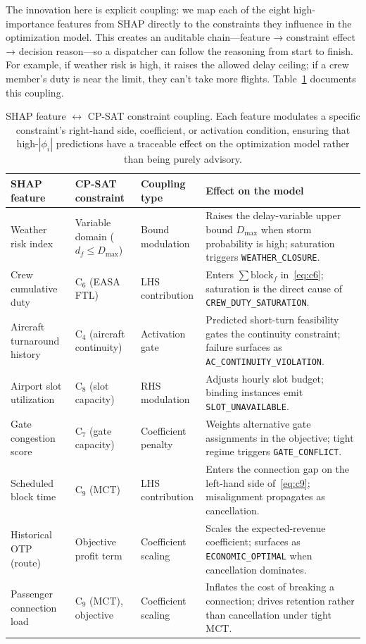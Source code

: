 \documentclass[12pt,number]{elsarticle}
\begin{document}
The innovation here is explicit coupling: we map each of the eight high-importance features from SHAP directly to the constraints they influence in the optimization model. This creates an auditable chain---feature → constraint effect → decision reason---so a dispatcher can follow the reasoning from start to finish. For example, if weather risk is high, it raises the allowed delay ceiling; if a crew member's duty is near the limit, they can't take more flights. Table~\ref{tab:xai_coupling} documents this coupling.

\begin{table}[H]
\centering
\footnotesize
\caption{SHAP feature $\leftrightarrow$ CP-SAT constraint coupling. Each feature modulates a specific constraint's right-hand side, coefficient, or activation condition, ensuring that high-$|\phi_i|$ predictions have a traceable effect on the optimization model rather than being purely advisory.}
\label{tab:xai_coupling}
\begin{tabular}{@{}>{\raggedright\arraybackslash}p{3cm}>{\raggedright\arraybackslash}p{2.2cm}>{\raggedright\arraybackslash}p{2.2cm}>{\raggedright\arraybackslash}p{5.5cm}@{}}
\toprule
\textbf{SHAP feature} & \textbf{CP-SAT constraint} & \textbf{Coupling type} & \textbf{Effect on the model} \\
\midrule
Weather risk index          & Variable domain ($d_f \leq D_{\max}$) & Bound modulation     & Raises the delay-variable upper bound $D_{\max}$ when storm probability is high; saturation triggers \texttt{WEATHER\_CLOSURE}. \\
Crew cumulative duty        & C$_6$ (EASA FTL)            & LHS contribution     & Enters $\sum \mathrm{block}_f$ in~\eqref{eq:c6}; saturation is the direct cause of \texttt{CREW\_DUTY\_SATURATION}. \\
Aircraft turnaround history & C$_4$ (aircraft continuity) & Activation gate      & Predicted short-turn feasibility gates the continuity constraint; failure surfaces as \texttt{AC\_CONTINUITY\_VIOLATION}. \\
Airport slot utilization    & C$_8$ (slot capacity)       & RHS modulation       & Adjusts hourly slot budget; binding instances emit \texttt{SLOT\_UNAVAILABLE}. \\
Gate congestion score       & C$_7$ (gate capacity)       & Coefficient penalty  & Weights alternative gate assignments in the objective; tight regime triggers \texttt{GATE\_CONFLICT}. \\
Scheduled block time        & C$_9$ (MCT)                 & LHS contribution     & Enters the connection gap on the left-hand side of~\eqref{eq:c9}; misalignment propagates as cancellation. \\
Historical OTP (route)      & Objective profit term       & Coefficient scaling  & Scales the expected-revenue coefficient; surfaces as \texttt{ECONOMIC\_OPTIMAL} when cancellation dominates. \\
Passenger connection load   & C$_9$ (MCT), objective      & Coefficient scaling  & Inflates the cost of breaking a connection; drives retention rather than cancellation under tight MCT. \\
\bottomrule
\end{tabular}
\end{table}
\end{document}
